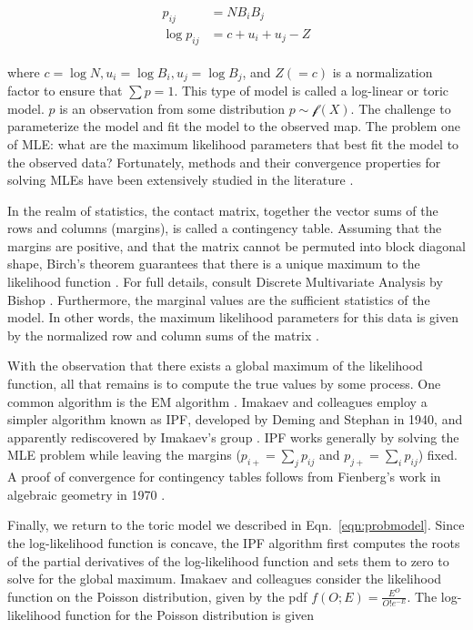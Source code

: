 \begin{align}
  \label{eqn:probmodel}
  \begin{split}
    p_{ij} &= NB_{i}B_{j}
    \\
    \log{p_{ij}} &=  c + u_i + u_j - Z
  \end{split}
\end{align}

where $c = \log{N}, u_i = \log{B_i}, u_j = \log{B_j}$, and $Z (= c)$ is a normalization factor to ensure that $\sum p = 1$.  This type of
model is called a \gls{log-linear} or \gls{toric model}.  $p$ is an observation from some distribution $p \sim \mathcal{f}(X)$.  The challenge to
parameterize the model and fit the model to the observed map.  The problem one of \gls{MLE}: what are the maximum likelihood parameters
that best fit the model to the observed data?  Fortunately, methods and their convergence properties for solving \glspl{MLE} have been extensively
studied in the literature \citep{fienberg2012, pachter2005}.

In the realm of statistics, the contact matrix, together the vector sums of the rows and columns (margins), is called a \gls{contingency table}.  Assuming
that the margins are positive, and that the matrix cannot be permuted into block diagonal shape, Birch's theorem guarantees that there is a
unique maximum to the likelihood function \citep{pachter2005,bishop1975}.  For full details, consult Discrete Multivariate Analysis by
Bishop \citep{bishop1975}.  Furthermore, the marginal values are the \glspl{sufficient statistic} of the model.  In other words, the maximum
likelihood parameters for this data is given by the normalized row and column sums of the matrix \citep{pachter2005}.

With the observation that there exists a global maximum of the likelihood function, all that remains is to compute the true values by some
process.  One common algorithm is the \gls{EM} algorithm \citep{fuchs1982}.  Imakaev and colleagues employ a simpler algorithm known as \gls{IPF},
developed by Deming and Stephan in 1940, and apparently rediscovered by Imakaev's group \citep{deming1940}.  \gls{IPF} works generally by solving
the \gls{MLE} problem while leaving the margins ($p_{i+} = \sum_{j}p_{ij}$ and $p_{j+} = \sum_{i}p_{ij}$) fixed.  A proof of convergence for contingency
tables follows from Fienberg's work in algebraic geometry in 1970 \citep{fienberg1970}. %

Finally, we return to the \gls{toric model} we described in Eqn.~\eqref{eqn:probmodel}.  Since the log-likelihood function is concave, the \gls{IPF} algorithm first
computes the roots of the partial derivatives of the log-likelihood function and sets them to zero to solve for the global maximum.  Imakaev
and colleagues consider the likelihood function on the Poisson distribution, given by the \gls{pdf} $f(O;E) = \frac{E^{O}}{O!e^{-E}}$.  The
log-likelihood function for the Poisson distribution is given

